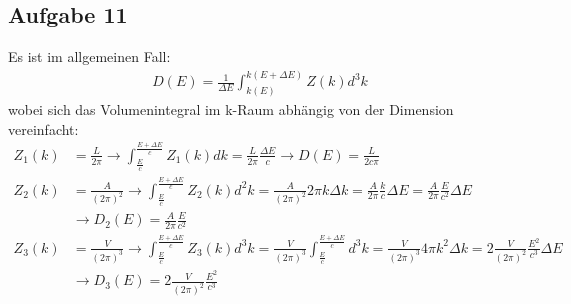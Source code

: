 \subsection*{Aufgabe 11}
Es ist im allgemeinen Fall:
\begin{align*}
D(E)=\frac{1}{\Delta E}\int_{k(E)}^{k(E+\Delta E)} Z(k) d^3k\end{align*}
wobei sich das Volumenintegral im k-Raum abhängig von der Dimension vereinfacht:
\begin{align*}
Z_1(k) &= \frac{L}{2\pi} \rightarrow \int_{\frac{E}{c}}^{\frac{E+\Delta E}{c}} Z_1(k) dk = \frac{L}{2\pi} \frac{\Delta E}{c} \rightarrow D(E)=\frac{L}{2c\pi}\\
Z_2(k) &= \frac{A}{(2\pi)^2} \rightarrow \int_{\frac{E}{c}}^{\frac{E+\Delta E}{c}} Z_2(k) d^2k = \frac{A}{(2\pi)^2} 2\pi k \Delta k =\frac{A}{2\pi} \frac{k}{c} \Delta E = \frac{A}{2\pi}\frac{E}{c^2} \Delta E \\
&\rightarrow D_2(E) = \frac{A}{2\pi}\frac{E}{c^2}\\
Z_3(k) &= \frac{V}{(2\pi)^3} \rightarrow \int_{\frac{E}{c}}^{\frac{E+\Delta E}{c}} Z_3(k) d^3k = \frac{V}{(2\pi)^3}\int_{\frac{E}{c}}^{\frac{E+\Delta E}{c}} d^3k = \frac{V}{(2\pi)^3}4\pi k^2 \Delta k = 2\frac{V}{(2\pi)^2} \frac{E^2}{c^3} \Delta E\\
&\rightarrow D_3(E) = 2\frac{V}{(2\pi)^2} \frac{E^2}{c^3}
\end{align*}
